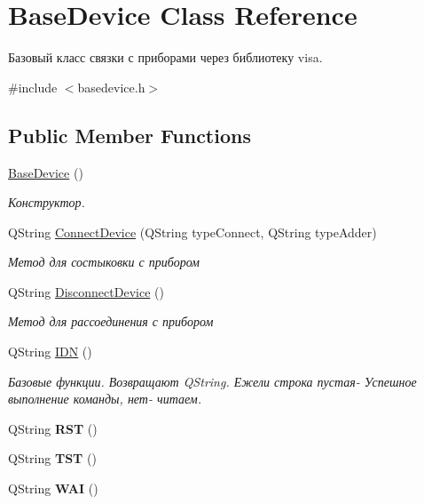 \hypertarget{class_base_device}{}\section{Base\+Device Class Reference}
\label{class_base_device}


Базовый класс связки с приборами через библиотеку visa.  




{\ttfamily \#include $<$basedevice.\+h$>$}

\subsection*{Public Member Functions}
\begin{DoxyCompactItemize}
\item 
\hyperlink{class_base_device_a163a3af4b53ebe0a947c62074f6216f3}{Base\+Device} ()
\begin{DoxyCompactList}\small\item\em Конструктор. \end{DoxyCompactList}\item 
Q\+String \hyperlink{class_base_device_ae1cd92f757a47b0a7ebc0dfa2247e313}{Connect\+Device} (Q\+String type\+Connect, Q\+String type\+Adder)
\begin{DoxyCompactList}\small\item\em Метод для состыковки с прибором \end{DoxyCompactList}\item 
Q\+String \hyperlink{class_base_device_af6b2ad4cb09e0d0115f0e883e747bf9b}{Disconnect\+Device} ()
\begin{DoxyCompactList}\small\item\em Метод для рассоединения с прибором \end{DoxyCompactList}\item 
\hypertarget{class_base_device_afeaaa2f48222274407eb7c23194b181f}{}\label{class_base_device_afeaaa2f48222274407eb7c23194b181f} 
Q\+String \hyperlink{class_base_device_afeaaa2f48222274407eb7c23194b181f}{I\+DN} ()
\begin{DoxyCompactList}\small\item\em Базовые функции. Возвращают Q\+String. Ежели строка пустая-\/ Успешное выполнение команды, нет-\/ читаем. \end{DoxyCompactList}\item 
\hypertarget{class_base_device_acfb9d32117cf99db00c3098987e8f68e}{}\label{class_base_device_acfb9d32117cf99db00c3098987e8f68e} 
Q\+String {\bfseries R\+ST} ()
\item 
\hypertarget{class_base_device_aded8d300b85bf23b7343c0d609c0a906}{}\label{class_base_device_aded8d300b85bf23b7343c0d609c0a906} 
Q\+String {\bfseries T\+ST} ()
\item 
\hypertarget{class_base_device_a4be114e86b77b0fb111935fffb7fae96}{}\label{class_base_device_a4be114e86b77b0fb111935fffb7fae96} 
Q\+String {\bfseries W\+AI} ()
\end{DoxyCompactItemize}
